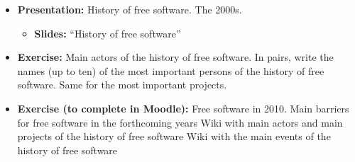 \documentclass[a4paper]{article}
\begin{document}
\begin{itemize}
\item \textbf{Presentation:} History of free software. The 2000s.
  \begin{itemize}
  \item \textbf{Slides:} ``History of free software''
  \end{itemize}

\item \textbf{Exercise:} Main actors of the history of free software. In pairs, write the names (up to ten) of the most important persons of the history of free software. Same for the most important projects.

\item \textbf{Exercise (to complete in Moodle):} 
Free software in 2010.
Main barriers for free software in the forthcoming years
Wiki with main actors and main projects of the history of free software
Wiki with the main events of the history of free software
\end{itemize}
\end{document}
